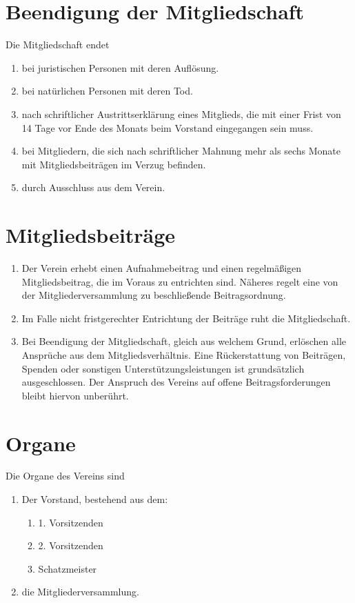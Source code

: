 \documentclass[a4paper, 12pt]{scrartcl}
\begin{document}
\section{Beendigung der Mitgliedschaft}
Die Mitgliedschaft endet
\begin{enumerate}
	\item bei juristischen Personen mit deren Auflösung.
	\item bei natürlichen Personen mit deren Tod.
	\item nach schriftlicher Austrittserklärung eines Mitglieds, die mit einer Frist von 14 Tage vor Ende des Monats beim Vorstand eingegangen sein muss.
	\item bei Mitgliedern, die sich nach schriftlicher Mahnung mehr als sechs Monate mit Mitgliedsbeiträgen im Verzug befinden.
	\item durch Ausschluss aus dem Verein.
\end{enumerate}

\section{Mitgliedsbeiträge}
\begin{enumerate}
	\item Der Verein erhebt einen Aufnahmebeitrag und einen regelmäßigen Mitgliedsbeitrag, die im Voraus zu entrichten sind. Näheres regelt eine von der Mitgliederversammlung zu beschließende Beitragsordnung.
	\item Im Falle nicht fristgerechter Entrichtung der Beiträge ruht die Mitgliedschaft.
	\item Bei Beendigung der Mitgliedschaft, gleich aus welchem Grund, erlöschen alle Ansprüche aus dem Mitgliedsverhältnis. Eine Rückerstattung von Beiträgen, Spenden oder sonstigen Unterstützungsleistungen ist grundsätzlich ausgeschlossen. Der Anspruch des Vereins auf offene Beitragsforderungen bleibt hiervon unberührt.
\end{enumerate}

\section{Organe}
Die Organe des Vereins sind
\begin{enumerate}
	\item Der Vorstand, bestehend aus dem:
	\begin{enumerate}
		\item 1. Vorsitzenden
		\item 2. Vorsitzenden
		\item Schatzmeister
	\end{enumerate}
	\item die Mitgliederversammlung.
\end{enumerate}
\end{document}
